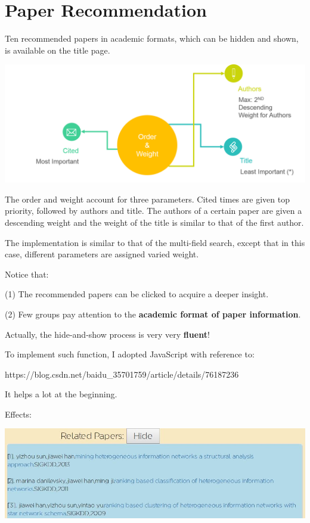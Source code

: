 \documentclass[10pt,twoside,a4paper,titlepage]{article}
\begin{document}
	\section{Paper Recommendation}
		Ten recommended papers in academic formats, which can be hidden and shown, is available on the title page.\par
		\includegraphics[width=1\textwidth]{gzl/07.png}\par
		The order and weight account for three parameters. Cited times are given top priority, followed by authors and title. The authors of a certain paper are given a descending weight and the weight of the title is similar to that of the first author.\newline\par
		The implementation is similar to that of the multi-field search, except that in this case, different parameters are assigned varied weight.\par
		Notice that:\par
		\indent\indent(1) The recommended papers can be clicked to acquire a deeper insight.\par
		\indent\indent(2) Few groups pay attention to the \textbf{academic format of paper information}.\newline\par
		Actually, the hide-and-show process is very very \textbf{fluent}!\par
		To implement such function, I adopted JavaScript with reference to:\par
		\indent\indent https://blog.csdn.net/baidu\_35701759/article/details/76187236\par
		It helps a lot at the beginning.\newline\par
		Effects:\newline\par
		\includegraphics[width=1\textwidth]{gzl/10.jpg}\newline\par
\end{document}
